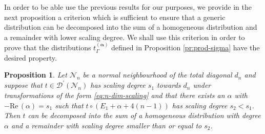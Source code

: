 \documentclass[a4paper,10pt,twoside]{article}
\numberwithin{equation}{section}
\newcounter{and}
\def\N{\mathcal{N}}
\def\D{\mathcal{D}}
\def\Ree{\mathrm{Re}\,}
\def\balpha{{\boldsymbol{\alpha}}}
\theoremstyle{plain}
\newtheorem{propo}[theo]{Proposition}
\theoremstyle{definition}
\begin{document}
In order to be able use the previous results for our purposes, we provide in the next proposition a criterion which is sufficient to ensure that a generic distribution can be decomposed into the sum of a homogeneous distribution and a remainder with lower scaling degree. We shall use this criterion in order to prove that the distributions $t_\Gamma^{(\balpha)}$ defined in Proposition \ref{pr:prod-sigma}
have the desired property.

\begin{propo}\label{pr:set} Let $\N_n$ be a normal neighbourhood of the total diagonal $d_n$ and suppose that $t\in \D^\prime(\N_n)$ has scaling degree $s_1$ towards $d_n$ under transformations of the form \eqref{eq:n-dim-scaling} and that there exists an $\alpha$ with $-\Ree(\alpha)=s_1$ such that $t\circ(E_1+\alpha+4(n-1))$ has scaling degree $s_2 < s_1$. Then $t$ can be decomposed into the sum of a homogeneous distribution with degree $\alpha$ and a remainder with scaling degree smaller than or equal to $s_2$.
\end{propo}
\end{document}
